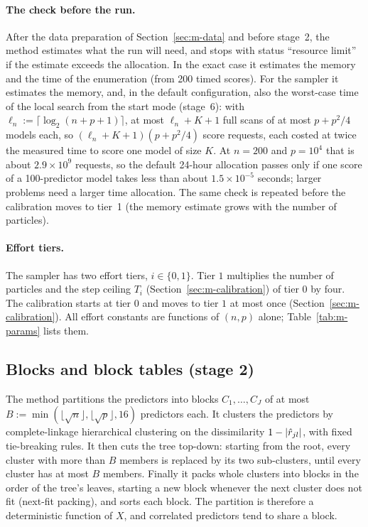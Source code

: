\documentclass[11pt]{article}
\begin{document}
\paragraph{The check before the run.} After the data preparation of Section~\ref{sec:m-data} and before stage~2, the
method estimates what the run will need, and stops with status ``resource limit'' if the estimate exceeds the
allocation. In the exact case it estimates the memory and the time of the
enumeration (from 200 timed scores). For the sampler it estimates the memory, and, in the default configuration, also the
worst-case time of the local search from the start mode (stage~6): with $\ell_n:=\lceil\log_2(n+p+1)\rceil$, at most
$\ell_n+K+1$ full scans of at most $p+p^2/4$ models each, so $(\ell_n+K+1)(p+p^2/4)$ score requests, each costed at twice
the measured time to score one model of size $K$. At $n=200$ and $p=10^4$ that is about $2.9\times10^9$ requests, so the default 24-hour allocation passes
only if one score of a 100-predictor model takes less than about $1.5\times10^{-5}$ seconds; larger problems need a larger
time allocation. The same check is repeated before the calibration moves to tier~1 (the memory estimate grows with the
number of particles).

\paragraph{Effort tiers.} The sampler has two effort tiers, $i\in\{0,1\}$. Tier $1$ multiplies the number of particles and
the step ceiling $T_i$ (Section~\ref{sec:m-calibration}) of tier $0$ by four. The calibration starts at tier $0$ and moves to tier $1$ at most once
(Section~\ref{sec:m-calibration}). All effort constants are functions of $(n,p)$ alone; Table~\ref{tab:m-params} lists
them.

\subsection{Blocks and block tables (stage 2)}\label{sec:m-blocks}

The method partitions the predictors into blocks $C_1,\dots,C_J$ of at most $B:=\min(\lfloor\sqrt n\rfloor,\lfloor\sqrt
p\rfloor,16)$ predictors each. It clusters the predictors by complete-linkage hierarchical clustering on the dissimilarity
$1-\lvert \hat r_{jl}\rvert$, with fixed tie-breaking rules. It then cuts the tree top-down: starting from the root, every
cluster with more than $B$ members is replaced by its two sub-clusters, until every cluster has at most $B$ members.
Finally it packs whole clusters into blocks in the order of the tree's leaves, starting a new block whenever the next
cluster does not fit (next-fit packing), and sorts each block. The partition is therefore a deterministic function of
$X$, and correlated predictors tend to share a block.
\end{document}
